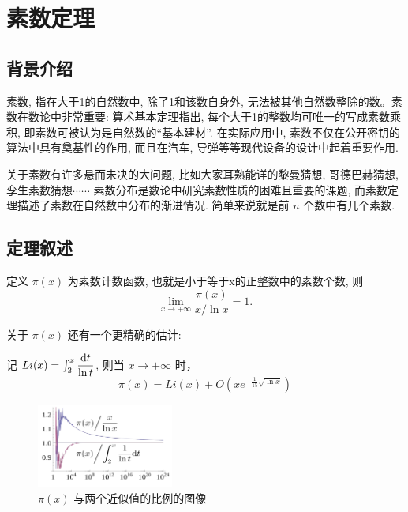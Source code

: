 \documentclass[main]{subfiles}
\def\dif{\textup{d}}
\begin{document}
\renewcommand{\filename}{素数定理}%
\section{素数定理}
\subsection*{背景介绍}
素数, 指在大于1的自然数中, 除了1和该数自身外, 无法被其他自然数整除的数。素数在数论中非常重要: 算术基本定理指出, 每个大于1的整数均可唯一的写成素数乘积, 即素数可被认为是自然数的“基本建材”.
在实际应用中, 素数不仅在公开密钥的算法中具有奠基性的作用, 而且在汽车, 导弹等等现代设备的设计中起着重要作用.
\par 关于素数有许多悬而未决的大问题, 比如大家耳熟能详的黎曼猜想, 哥德巴赫猜想, 孪生素数猜想$\cdots \cdots$ 素数分布是数论中研究素数性质的困难且重要的课题, 而素数定理描述了素数在自然数中分布的渐进情况. 简单来说就是前 $n$ 个数中有几个素数.
\subsection{定理叙述}
\begin{theorem}[素数定理]
    定义 $\pi(x)$ 为素数计数函数, 也就是小于等于x的正整数中的素数个数, 则
    \[ \lim_{x \rightarrow + \infty} \frac{\pi(x)}{x/ \ln x} = 1. \]
\end{theorem}
关于 $\pi(x)$ 还有一个更精确的估计: 
\begin{theorem}[另一个估计]
    记 $Li(x) = \int_{2}^{x} \dfrac{\dif t}{\ln t}$, 则当 $x \rightarrow + \infty$ 时，
    \[ \pi(x) = Li(x) + O(xe^{-\frac{1}{15} \sqrt{\ln x}}) \]
    
\end{theorem}

\begin{figure}[H]
	\centering
		\includegraphics[width=0.40\textwidth]{pnt1.png}
		 \caption{$\pi(x)$ 与两个近似值的比例的图像}
\end{figure}
\end{document}
